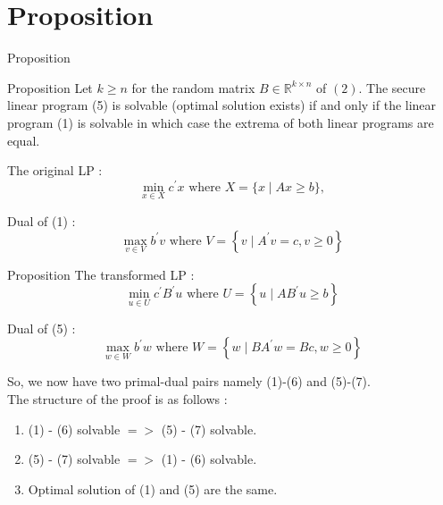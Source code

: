 \documentclass[9pt]{beamer}
\begin{document}
\section{Proposition}

\begin{frame}{Proposition}
\begin{block}{Proposition}
Let $k \geq n$ for the random matrix $B \in \mathbb{R}^{k \times n}$ of $(2) $. The secure linear program (5) is solvable (optimal solution exists) if and only if the linear program (1) is solvable in which case the extrema of both linear programs are equal.
\end{block}

\vspace{0.1cm}
The original LP :
\begin{equation} \tag{1}
\min _{x \in X} c^{\prime} x \text { where } X=\{x \mid A x \geq b\},
\end{equation}

Dual of (1) :
\begin{equation}
\max _{v \in V} b^{\prime} v \text { where } V=\left\{v \mid A^{\prime} v=c, v \geq 0\right\}
\end{equation}
\end{frame}

\begin{frame}{Proposition}
The transformed LP :
\begin{equation} \tag{5}
\min _{u \in U} c^{\prime} B^{\prime} u \text { where } U=\left\{u \mid A B^{\prime} u \geq b\right\}
\end{equation}

Dual of (5) :
\begin{equation}
\max _{w \in W} b^{\prime} w \text { where } W=\left\{w \mid B A^{\prime} w=B c, w \geq 0\right\}
\end{equation}

So, we now have two primal-dual pairs namely (1)-(6) and (5)-(7).\\
\vspace{0.2cm}
The structure of the proof is as follows :
\begin{enumerate}
    \item (1) - (6) solvable $ => $ (5) - (7) solvable.
    
    \item (5) - (7) solvable $ => $ (1) - (6) solvable. 
    
    \item Optimal solution of (1) and (5) are the same.
\end{enumerate}
\end{frame}
\end{document}
